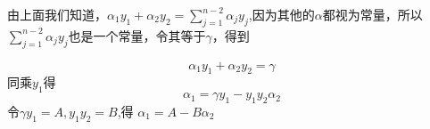 \documentclass[UTF8]{ctexart}
\begin{document}


由上面我们知道，$ \alpha_1y_1 + \alpha_2y_2 = \sum_{j=1}^{n-2} \alpha_j y_j $,因为其他的$\alpha$都视为常量，所以$\sum_{j=1}^{n-2} \alpha_j y_j $也是一个常量，令其等于$\gamma$，得到








$$ \alpha_1y_1 + \alpha_2y_2 = \gamma  $$
\noindent 同乘$y_1$得
$$ \alpha_1 = \gamma  y_1 - y_1y_2\alpha_2 $$
令$\gamma y_1=A,y_1y_2=B$,得
$\alpha_1=A-B\alpha_2$
\end{document}
